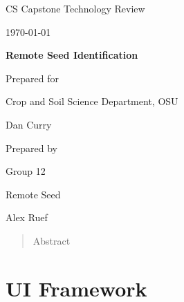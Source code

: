 \documentclass[onecolumn, draftclsnofoot,10pt, compsoc]{IEEEtran}
\def \CapstoneTeamName{		Remote Seed}
\def \CapstoneTeamNumber{		12}
\def \GroupMemberOne{			Quanah Green}
\def \GroupMemberTwo{			Alex Ruef}
\def \GroupMemberThree{			Ethan Takla}
\def \CapstoneProjectName{		Remote Seed Identification}
\def \CapstoneSponsorCompany{	Crop and Soil Science Department, OSU}
\def \CapstoneSponsorPerson{		Dan Curry}
\def \DocType{		%
				Technology Review
				}
\newcommand{\NameSigPair}[1]{\par
\makebox[2.75in][r]{#1} \hfil 	\makebox[3.25in]{\makebox[2.25in]{\hrulefill} \hfill		\makebox[.75in]{\hrulefill}}
\par\vspace{-12pt} \textit{\tiny\noindent
\makebox[2.75in]{} \hfil		\makebox[3.25in]{\makebox[2.25in][r]{Signature} \hfill	\makebox[.75in][r]{Date}}}}
\renewcommand{\NameSigPair}[1]{#1}
\begin{document}
\begin{titlepage}
    \begin{singlespace}
        \hfill 
        \par\vspace{.2in}
        \centering
        \scshape{
            \huge CS Capstone \DocType \par
            {\large\today}\par
            \vspace{.5in}
            \textbf{\Huge\CapstoneProjectName}\par
            \vfill
            {\large Prepared for}\par
            \Huge \CapstoneSponsorCompany\par
            \vspace{5pt}
            {\Large\NameSigPair{\CapstoneSponsorPerson}\par}
            {\large Prepared by }\par
            Group\CapstoneTeamNumber\par
            \CapstoneTeamName\par 
            \vspace{5pt}
            {\Large
                \NameSigPair{\GroupMemberTwo}\par
            }
            \vspace{20pt}
        }
        \begin{abstract}
        Abstract
        \end{abstract}     
    \end{singlespace}
\end{titlepage}
\newpage
{}
\tableofcontents
\clearpage
\section{UI Framework}
\end{document}
